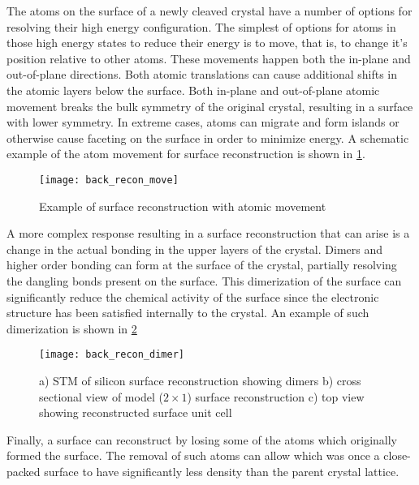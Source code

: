 The atoms on the surface of a newly cleaved crystal have a number of options for resolving their high energy configuration. The simplest of options for atoms in those high energy states to reduce their energy is to move, that is, to change it's position relative to other atoms. These movements happen both the in-plane and out-of-plane directions. Both atomic translations can cause additional shifts in the atomic layers below the surface.  Both in-plane and out-of-plane atomic movement breaks the bulk symmetry of the original crystal, resulting in a surface with lower symmetry. In extreme cases, atoms can migrate and form islands or otherwise cause faceting on the surface in order to minimize energy. A schematic example of the atom movement for surface reconstruction is shown in \cref{fig:back_recon_move}.
\begin{figure}
    \centering
    \texttt{[image: back\_recon\_move]}
    \caption{\label{fig:back_recon_move}Example of surface reconstruction with atomic movement\cite{ohring2001materials}}
\end{figure}

A more complex response resulting in a surface reconstruction that can arise is a change in the actual bonding in the upper layers of the crystal. Dimers and higher order bonding can form at the surface of the crystal, partially resolving the dangling bonds present on the surface. This dimerization of the surface can significantly reduce the chemical activity of the surface since the electronic structure has been satisfied internally to the crystal. An example of such dimerization is shown in \cref{fig:back_recon_dimer}
\begin{figure}
    \centering
    \texttt{[image: back\_recon\_dimer]}
    \caption{\label{fig:back_recon_dimer}a) STM of silicon surface reconstruction showing dimers b) cross sectional view of model ($2 \times 1$) surface reconstruction c) top view showing reconstructed surface unit cell \cite{ohring35}} 
\end{figure}

Finally, a surface can reconstruct by losing some of the atoms which originally formed the surface. The removal of such atoms can allow which was once a close-packed surface to have significantly less density than the parent crystal lattice.

